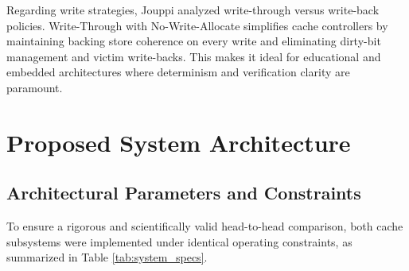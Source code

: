 \documentclass[10pt,twocolumn]{article}
\begin{document}
Regarding write strategies, Jouppi \cite{jouppi1993} analyzed write-through versus write-back policies. Write-Through with No-Write-Allocate simplifies cache controllers by maintaining backing store coherence on every write and eliminating dirty-bit management and victim write-backs. This makes it ideal for educational and embedded architectures where determinism and verification clarity are paramount.

\section{Proposed System Architecture}

\subsection{Architectural Parameters and Constraints}
To ensure a rigorous and scientifically valid head-to-head comparison, both cache subsystems were implemented under identical operating constraints, as summarized in Table \ref{tab:system_specs}.

\begin{table}[htbp]
\centering
\caption{System-Level Hardware Parameters}
\label{tab:system_specs}
\end{table}
\end{document}
